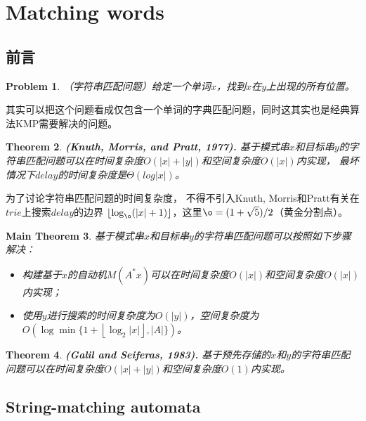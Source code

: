 \documentclass[UTF8]{ctexart}
\newtheorem{thm}{Theorem}[subsection]
\newtheorem{prob}[thm]{Problem}
\newtheorem{mthm}[thm]{Main Theorem}
\theoremstyle{definition}
\theoremstyle{remark}
\numberwithin{equation}{subsection}
\newcommand{\Emph}{\textbf}
\begin{document}
\section{Matching words}

\subsection{前言}	
	
	\begin{prob}
		（字符串匹配问题）给定一个单词$x$，找到$x$在$y$上出现的所有位置。
	\end{prob}
	其实可以把这个问题看成仅包含一个单词的字典匹配问题，同时这其实也是经典算法KMP需要解决的问题。
	
	\begin{thm}
		\Emph{(Knuth, Morris, and Pratt, 1977).}
		基于模式串$x$和目标串$y$的字符串匹配问题可以在时间复杂度$O(|x|+|y|)$和空间复杂度$O(|x|)$内实现，
		最坏情况下$delay$的时间复杂度是$\Theta(log|x|)$。
	\end{thm}
	为了讨论字符串匹配问题的时间复杂度，
	不得不引入Knuth, Morris和Pratt有关在$trie$上搜索$delay$的边界
	$\left\lfloor \log_{\o}(|x|+1) \right\rfloor$，这里${\o} = (1+\sqrt5)/2$（黄金分割点）。
	
	\begin{mthm}
		基于模式串$x$和目标串$y$的字符串匹配问题可以按照如下步骤解决：
		\begin{itemize}
			\item 构建基于$x$的自动机$M(A^*x)$可以在时间复杂度$O(|x|)$和空间复杂度$O(|x|)$内实现；
			\item 使用$y$进行搜索的时间复杂度为$O(|y|)$，空间复杂度为$O(\log \min \{ 1+\left\lfloor \log_2|x| \right\rfloor, |A| \})$。
		\end{itemize}
	\end{mthm}
	\begin{thm}
		\Emph{(Galil and Seiferas, 1983).}
		基于预先存储的$x$和$y$的字符串匹配问题可以在时间复杂度$O(|x|+|y|)$和空间复杂度$O(1)$内实现。
	\end{thm}
	
\subsection{String-matching automata}
\end{document}
